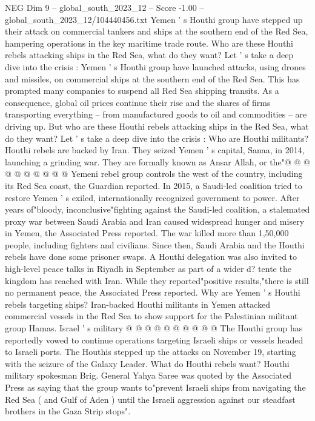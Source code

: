 \begin{textsample}{NEG Dim 9 – global\_south\_2023\_12 – Score -1.00 – global\_south\_2023\_12/104440456.txt}  \label{ex:f9_neg_443}
Yemen ' s Houthi group have stepped up their attack on commercial tankers and ships at the southern end of the Red Sea, hampering operations in the key maritime trade route.
Who are these Houthi rebels attacking ships in the Red Sea, what do they want?
Let ' s take a deep dive into the crisis : Yemen ' s Houthi group have launched attacks, using drones and missiles, on commercial ships at the southern end of the Red Sea.
This has prompted many companies to suspend all Red Sea shipping transits.
As a consequence, global oil prices continue their rise and the shares of firms transporting everything -- from manufactured goods to oil and commodities -- are driving up.
But who are these Houthi rebels attacking ships in the Red Sea, what do they want?
Let ' s take a deep dive into the crisis : Who are Houthi militants?
Houthi rebels are backed by Iran.
They seized Yemen ' s capital, Sanaa, in 2014, launching a grinding war.
They are formally known as Ansar Allah, or the"@ @ @ @ @ @ @ @ @ @ Yemeni rebel group controls the west of the country, including its Red Sea coast, the Guardian reported.
In 2015, a Saudi-led coalition tried to restore Yemen ' s exiled, internationally recognized government to power.
After years of"bloody, inconclusive"fighting against the Saudi-led coalition, a stalemated proxy war between Saudi Arabia and Iran caused widespread hunger and misery in Yemen, the Associated Press reported.
The war killed more than 1,50,000 people, including fighters and civilians.
Since then, Saudi Arabia and the Houthi rebels have done some prisoner swaps.
A Houthi delegation was also invited to high-level peace talks in Riyadh in September as part of a wider d? tente the kingdom has reached with Iran.
While they reported"positive results,"there is still no permanent peace, the Associated Press reported.
Why are Yemen ' s Houthi rebels targeting ships?
Iran-backed Houthi militants in Yemen attacked commercial vessels in the Red Sea to show support for the Palestinian militant group Hamas.
Israel ' s military @ @ @ @ @ @ @ @ @ @ The Houthi group has reportedly vowed to continue operations targeting Israeli ships or vessels headed to Israeli ports.
The Houthis stepped up the attacks on November 19, starting with the seizure of the Galaxy Leader.
What do Houthi rebels want?
Houthi military spokesman Brig.
General Yahya Saree was quoted by the Associated Press as saying that the group wants to"prevent Israeli ships from navigating the Red Sea ( and Gulf of Aden ) until the Israeli aggression against our steadfast brothers in the Gaza Strip stops".

\end{textsample}
